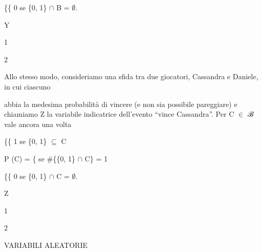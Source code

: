 \documentclass[a4paper,portrait,12pt]{article}
\begin{document}
\begin{flushleft}
\{\{ 0 se \{0, 1\} $\cap$ B = $\emptyset$.
\end{flushleft}


\begin{flushleft}
Y
\end{flushleft}





1


2





\begin{flushleft}
Allo stesso modo, consideriamo una sfida tra due giocatori, Cassandra e Daniele, in cui ciascuno
\end{flushleft}


\begin{flushleft}
abbia la medesima probabilit\`{a} di vincere (e non sia possibile pareggiare) e chiamiamo Z la variabile indicatrice dell'evento {``}vince Cassandra''. Per C $\in$ ℬ vale ancora una volta
\end{flushleft}





\begin{flushleft}
\{\{ 1 se \{0, 1\} $\subseteq$ C
\end{flushleft}


\begin{flushleft}
P (C) = \{ se \#\{\{0, 1\} $\cap$ C\} = 1
\end{flushleft}


\begin{flushleft}
\{\{ 0 se \{0, 1\} $\cap$ C = $\emptyset$.
\end{flushleft}


\begin{flushleft}
Z
\end{flushleft}





1


2










\begin{flushleft}
VARIABILI ALEATORIE
\end{flushleft}
\end{document}
